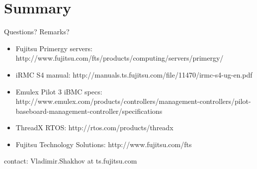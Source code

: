 \documentclass{beamer}
\begin{document}
\section*{Summary}
\begin{frame}{Questions? Remarks?}
  
  \begin{center}
  \end{center}

  \begin{itemize}
	  \item \tiny{Fujitsu Primergy servers: http://www.fujitsu.com/fts/products/computing/servers/primergy/ }
	  \item \tiny{iRMC S4 manual: http://manuals.ts.fujitsu.com/file/11470/irmc-s4-ug-en.pdf}
	  \item \tiny{Emulex Pilot 3 iBMC specs: http://www.emulex.com/products/controllers/management-controllers/pilot-baseboard-management-controller/specifications}
	  \item \tiny{ThreadX RTOS: http://rtos.com/products/threadx }
	  \item \tiny{Fujitsu Technology Solutions: http://www.fujitsu.com/fts}
	\end{itemize}

  contact: Vladimir.Shakhov at ts.fujitsu.com


\end{frame}
\end{document}
